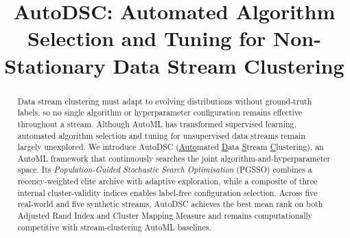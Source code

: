 \documentclass[conference]{IEEEtran}
\begin{document}
\title{AutoDSC: Automated Algorithm Selection and Tuning for Non-Stationary Data Stream Clustering}

\author{}


\maketitle

\begin{abstract}
Data stream clustering must adapt to evolving distributions without ground-truth labels, so no single algorithm or hyperparameter configuration remains effective throughout a stream. Although AutoML has transformed supervised learning, automated algorithm selection and tuning for unsupervised data streams remain largely unexplored. We introduce AutoDSC (\underline{Auto}mated \underline{D}ata \underline{S}tream \underline{C}lustering), an AutoML framework that continuously searches the joint algorithm-and-hyperparameter space. Its \textit{Population-Guided Stochastic Search Optimisation} (PGSSO) combines a recency-weighted elite archive with adaptive exploration, while a composite of three internal cluster-validity indices enables label-free configuration selection. Across five real-world and five synthetic streams, AutoDSC achieves the best mean rank on both Adjusted Rand Index and Cluster Mapping Measure and remains computationally competitive with stream-clustering AutoML baselines.
\end{abstract}
\end{document}
